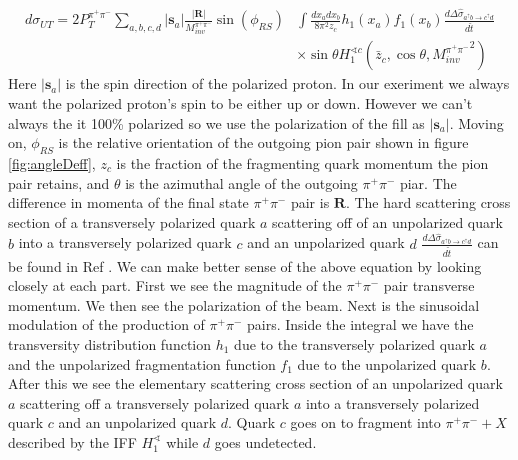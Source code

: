 \documentclass[abstract = on,listof=totoc, bibliography=totoc]{scrreprt}
\newcommand{\phirs}{\phi_{RS}}
\newcommand{\ptpair}{P_{T}^{\pi^+\pi^-}}
\newcommand{\mpair}{M_{inv}^{\pi^+\pi^-}}
\newcommand{\pip}{\pi^+}
\newcommand{\pim}{\pi^-}
\newcommand{\pair}{$\pip\pim$ }
\begin{document}
\begin{align}
\label{eq:crossSecUT_3}
d\sigma_{UT} = 2\ptpair \sum_{a,b,c,d} |\boldsymbol{s}_a| \frac{|\boldsymbol{R}|}{\mpair}\sin(\phirs) & \int \frac{dx_a dx_b}{8\pi^2 z_c} h_1(x_a) f_1(x_b) \frac{d\Delta\hat{\sigma}_{a^\uparrow b \rightarrow c^\uparrow d}}{d\hat{t}} \nonumber \\ 
&\times \sin\theta H_1^{\sphericalangle c} \left(\bar{z}_c,\cos\theta, {\mpair}^2\right) 
\end{align}
%
Here $|\bm{s}_a|$ is the spin direction of the polarized proton. In our exeriment we always want the polarized proton's spin to be either up or down. However we can't always the it 100\% polarized so we use the polarization of the fill as $|\bm{s}_a|$. Moving on, $\phirs$ is the relative orientation of the outgoing pion pair shown in figure \ref{fig:angleDeff}, $z_c$ is the fraction of the fragmenting quark momentum the pion pair retains, and $\theta$ is the azimuthal angle of the outgoing \pair piar. The difference in momenta of the final state \pair pair is $\boldsymbol{R}$. The hard scattering cross section of a transversely polarized quark $a$ scattering off of an unpolarized quark $b$ into a transversely polarized quark $c$ and an unpolarized quark $d$ $\frac{d\Delta\hat{\sigma}_{a^\uparrow b \rightarrow c^\uparrow d}}{d\hat{t}}$ can be found in Ref \cite{bacchettaRedici2}.
We can make better sense of the above equation by looking closely at each part. First we see the magnitude of the \pair pair transverse momentum. We then see the polarization of the beam. Next is the sinusoidal modulation of the production of \pair pairs. Inside the integral we have the transversity distribution function $h_1$ due to the transversely polarized quark $a$ and the unpolarized fragmentation function $f_1$ due to the unpolarized quark $b$. After this we see the elementary scattering cross section of an unpolarized quark $a$ scattering off a transversely polarized quark $a$ into a transversely polarized quark $c$ and an unpolarized quark $d$. Quark $c$ goes on to fragment into $\pip\pim + X$ described by the IFF $H_1^{\sphericalangle}$ while $d$ goes undetected. 
\end{document}
